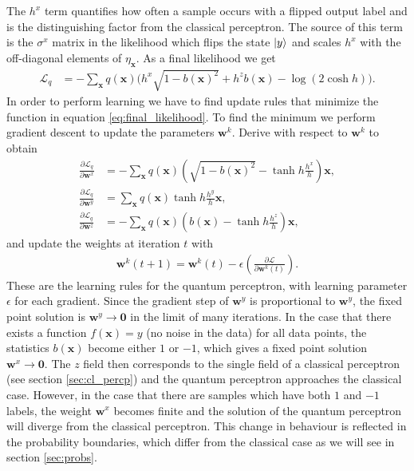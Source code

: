 The $h^x$ term quantifies how often a sample occurs with a flipped output label and is the distinguishing factor from the classical perceptron. The source of this term is the $\sigma^x$ matrix in the likelihood which flips the state $\ket{y}$ and scales $h^x$ with the off-diagonal elements of $\eta_\mathbf{x}$. As a final likelihood we get
\begin{align}
    \mathcal{L}_{q} &= -\sum_{\mathbf{x}} q(\mathbf{x})  \bigg(h^x \sqrt{1 - b(\mathbf{x})^2} + h^z b(\mathbf{x}) - \log(2\cosh{h})\bigg)\label{eq:final_likelihood}.
\end{align}
In order to perform learning we have to find update rules that minimize the function in equation \ref{eq:final_likelihood}. To find the minimum we perform gradient descent to update the parameters $\mathbf{w}^k$. Derive with respect to $\mathbf{w}^k$ to obtain
\begin{align}
    \frac{\partial \mathcal{L}_{q}}{\partial \mathbf{w}^x} &= -\sum_{\mathbf{x}} q(\mathbf{x})  \left(\sqrt{1 - b(\mathbf{x})^2}  - \tanh{h} \frac{h^x}{h}\right)\mathbf{x}\nonumber,\\
    \frac{\partial \mathcal{L}_{q}}{\partial \mathbf{w}^y} &= \sum_{\mathbf{x}} q(\mathbf{x}) \tanh{h} \frac{h^y}{h} \mathbf{x}\nonumber,\\
    \frac{\partial \mathcal{L}_{q}}{\partial \mathbf{w}^z} &= -\sum_{\mathbf{x}} q(\mathbf{x})  \left( b(\mathbf{\mathbf{x}}) - \tanh{h} \frac{h^z}{h} \right)\mathbf{x} \label{eq:grads},
\end{align}
and update the weights at iteration $t$ with
\begin{align}
    \mathbf{w}^k(t+1) =  \mathbf{w}^k(t) - \epsilon \left(\frac{\partial \mathcal{L}}{\partial \mathbf{w}^k(t)}\right).
    \label{eq:grad_desc}
\end{align}
These are the learning rules for the quantum perceptron, with learning parameter $\epsilon$ for each gradient. Since the gradient step of $\mathbf{w}^y$ is proportional to $\mathbf{w}^y$, the fixed point solution is $\mathbf{w}^y\rightarrow\bm{0}$ in the limit of many iterations. In the case that there exists a function $f(\mathbf{x}) = y$ (no noise in the data) for all data points, the statistics $b(\mathbf{x})$ become either $1$ or $-1$, which gives a fixed point solution $\mathbf{w}^x\rightarrow\bm{0}$. The $z$ field then corresponds to the single field of a classical perceptron (see section \ref{sec:cl_percp}) and the quantum perceptron approaches the classical case. However, in the case that there are samples which have both $1$ and $-1$ labels, the weight $\mathbf{w}^x$ becomes finite and the solution of the quantum perceptron will diverge from the classical perceptron. This change in behaviour is reflected in the probability boundaries, which differ from the classical case as we will see in section \ref{sec:probs}.


